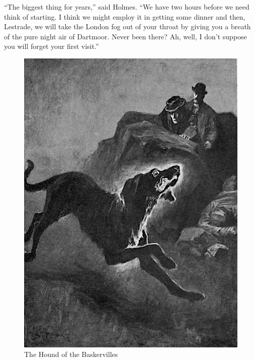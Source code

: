 \documentclass[paper=5.5in:8.5in,BCOR=7mm,twoside,DIV=calc,12pt,usegeometry,openany,chapterprefix,endperiod,headings=big]{scrbook} %
\begin{document}
\enquote{The biggest thing for years,} said Holmes. \enquote{We have two hours before we need think of starting. I think we might employ it in getting some dinner and then, Lestrade, we will take the London fog out of your throat by giving you a breath of the pure night air of Dartmoor. Never been there? Ah, well, I don't suppose you will forget your first visit.}
\clearpage
\vfill
\begin{figure}[tbph]
\centering
\includegraphics[width=\linewidth]{14_thehound}
\caption{The Hound of the Baskervilles}
\end{figure}
\vfill
\thispagestyle{empty}
\clearpage
\end{document}
